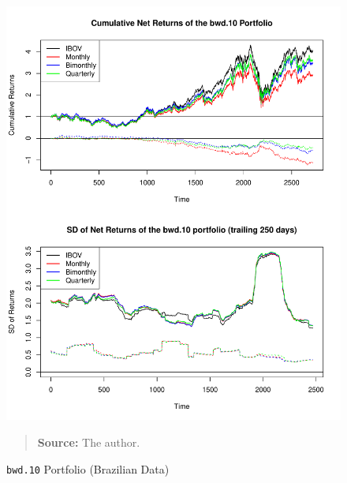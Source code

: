 \documentclass[preprint, doubleblind, authoryear,10pt]{elsarticle}
\begin{document}
\clearpage

\begin{figure}[htpb]
\centering
\footnotesize
\caption{\texttt{bwd.10} Portfolio (Brazilian Data)}
\label{fig:ibov:bwd.10}
\includegraphics[width=.95\linewidth]{./figs/IBOV-retac-bwd-10.pdf}
\begin{quote}
\textbf{Source:} The author.
\end{quote}
\end{figure}
\end{document}
